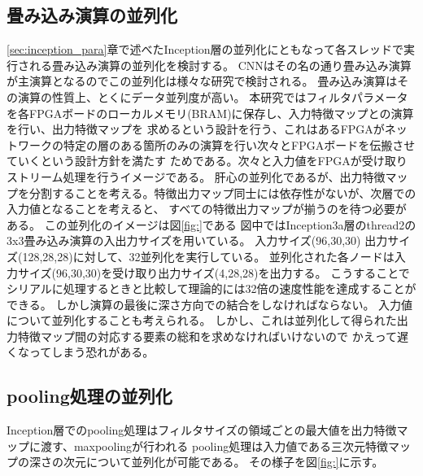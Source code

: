 {\subsection{畳み込み演算の並列化}
\label{sec:conv_para}
\ref{sec:inception_para}章で述べたInception層の並列化にともなって各スレッドで実行される畳み込み演算の並列化を検討する。
CNNはその名の通り畳み込み演算が主演算となるのでこの並列化は様々な研究で検討される。
畳み込み演算はその演算の性質上、とくにデータ並列度が高い。
本研究ではフィルタパラメータを各FPGAボードのローカルメモリ(BRAM)に保存し、入力特徴マップとの演算を行い、出力特徴マップを
求めるという設計を行う、これはあるFPGAがネットワークの特定の層のある箇所のみの演算を行い次々とFPGAボードを伝搬させていくという設計方針を満たす
ためである。次々と入力値をFPGAが受け取りストリーム処理を行うイメージである。
肝心の並列化であるが、出力特徴マップを分割することを考える。特徴出力マップ同士には依存性がないが、次層での入力値となることを考えると、
すべての特徴出力マップが揃うのを待つ必要がある。
この並列化のイメージは図\ref{fig:}である
図中ではInception3a層のthread2の3x3畳み込み演算の入出力サイズを用いている。
入力サイズ(96,30,30) 出力サイズ(128,28,28)に対して、32並列化を実行している。
並列化された各ノードは入力サイズ(96,30,30)を受け取り出力サイズ(4,28,28)を出力する。
こうすることでシリアルに処理するときと比較して理論的には32倍の速度性能を達成することができる。
しかし演算の最後に深さ方向での結合をしなければならない。
入力値について並列化することも考えられる。
しかし、これは並列化して得られた出力特徴マップ間の対応する要素の総和を求めなければいけないので
かえって遅くなってしまう恐れがある。

\subsection{pooling処理の並列化}
\label{sec:pool_para}
Inception層でのpooling処理はフィルタサイズの領域ごとの最大値を出力特徴マップに渡す、maxpoolingが行われる
pooling処理は入力値である三次元特徴マップの深さの次元について並列化が可能である。
その様子を図\ref{fig:}に示す。

}